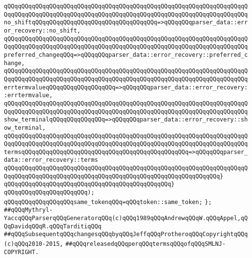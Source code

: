 \verb|qQQqqQQqqQQqqQQqqQQqqQQqqQQqqQQqqQQqqQQqqQQqqQQqqQQqqQQqqQQqqQQqqQQqqQQqqQQqqQQqqQQqqQQqqQQqqQQqqQQqqQQqqQQqqQQqqQQqqQQqqQQqqQQqqQQqqQQqqQQqno_shiftqQQqqQQqqQQqqQQqqQQqqQQqqQQqqQQqqQQq=>qQQqqQQqparser_data::error_recovery::no_shift,|\newline
\verb|qQQqqQQqqQQqqQQqqQQqqQQqqQQqqQQqqQQqqQQqqQQqqQQqqQQqqQQqqQQqqQQqqQQqqQQqqQQqqQQqqQQqqQQqqQQqqQQqqQQqqQQqqQQqqQQqqQQqqQQqqQQqqQQqqQQqqQQqqQQqpreferred_changeqQQq=>qQQqqQQqparser_data::error_recovery::preferred_change,|\newline
\verb|qQQqqQQqqQQqqQQqqQQqqQQqqQQqqQQqqQQqqQQqqQQqqQQqqQQqqQQqqQQqqQQqqQQqqQQqqQQqqQQqqQQqqQQqqQQqqQQqqQQqqQQqqQQqqQQqqQQqqQQqqQQqqQQqqQQqqQQqqQQqerrtermvalueqQQqqQQqqQQqqQQqqQQq=>qQQqqQQqparser_data::error_recovery::errtermvalue,|\newline
\verb|qQQqqQQqqQQqqQQqqQQqqQQqqQQqqQQqqQQqqQQqqQQqqQQqqQQqqQQqqQQqqQQqqQQqqQQqqQQqqQQqqQQqqQQqqQQqqQQqqQQqqQQqqQQqqQQqqQQqqQQqqQQqqQQqqQQqqQQqqQQqshow_terminalqQQqqQQqqQQqqQQq=>qQQqqQQqparser_data::error_recovery::show_terminal,|\newline
\verb|qQQqqQQqqQQqqQQqqQQqqQQqqQQqqQQqqQQqqQQqqQQqqQQqqQQqqQQqqQQqqQQqqQQqqQQqqQQqqQQqqQQqqQQqqQQqqQQqqQQqqQQqqQQqqQQqqQQqqQQqqQQqqQQqqQQqqQQqqQQqtermsqQQqqQQqqQQqqQQqqQQqqQQqqQQqqQQqqQQqqQQqqQQqqQQq=>qQQqqQQqparser_data::error_recovery::terms|\newline
\verb|qQQqqQQqqQQqqQQqqQQqqQQqqQQqqQQqqQQqqQQqqQQqqQQqqQQqqQQqqQQqqQQqqQQqqQQqqQQqqQQqqQQqqQQqqQQqqQQqqQQqqQQqqQQqqQQqqQQqqQQqqQQqqQQqqQQq}|\newline
\verb|qQQqqQQqqQQqqQQqqQQqqQQqqQQqqQQqqQQqqQQqqQQqqQQq}|\newline
\verb|qQQqqQQqqQQqqQQqqQQqqQQq);|\newline
\newline
\verb|qQQqqQQqqQQqqQQqqQQqsame_tokenqQQq=qQQqtoken::same_token;|\newline
\verb|};|\newline
\newline
\newline
\newline
\newline
\newline
\newline
\verb|##qQQqMythryl-YaccqQQqParserqQQqGeneratorqQQq(c)qQQq1989qQQqAndrewqQQqW.qQQqAppel,qQQqDavidqQQqR.qQQqTarditiqQQq|\newline
\verb|##qQQqSubsequentqQQqchangesqQQqbyqQQqJeffqQQqProtheroqQQqCopyrightqQQq(c)qQQq2010-2015,|\newline
\verb|##qQQqreleasedqQQqperqQQqtermsqQQqofqQQqSMLNJ-COPYRIGHT.|\newline


